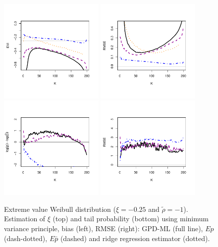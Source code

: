 \documentclass[twoside,leqno,11pt]{article}
\begin{document}
\begin{figure}[!ht]
  \centering
\includegraphics[width=0.45\textwidth]{weibullGPD_evi.pdf} 
\includegraphics[width=0.45\textwidth]{weibullGPD_rmse.pdf} \\
\includegraphics[width=0.45\textwidth]{weibullGPD_tail.pdf}
\includegraphics[width=0.45\textwidth]{weibullGPD_tail_rmse.pdf}  
 \caption{Extreme value Weibull distribution ($\xi=-0.25$ and $\tilde\rho=-1$). Estimation of $\xi$ (top) and tail probability (bottom) using minimum variance principle, bias (left), RMSE (right): GPD-ML (full line), $Ep$ (dash-dotted), $E\bar{p}$ (dashed) and ridge regression estimator (dotted).}
\end{figure}
\end{document}
